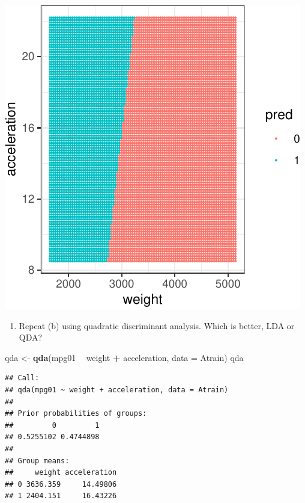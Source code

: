 \documentclass[]{article}
\newenvironment{Shaded}{\begin{snugshade}}{\end{snugshade}}
\newcommand{\DataTypeTok}[1]{\textcolor[rgb]{0.13,0.29,0.53}{#1}}
\newcommand{\KeywordTok}[1]{\textcolor[rgb]{0.13,0.29,0.53}{\textbf{#1}}}
\newcommand{\NormalTok}[1]{#1}
\newcommand{\OperatorTok}[1]{\textcolor[rgb]{0.81,0.36,0.00}{\textbf{#1}}}
\newcommand{\StringTok}[1]{\textcolor[rgb]{0.31,0.60,0.02}{#1}}
\providecommand{\tightlist}{%
  \setlength{\itemsep}{0pt}\setlength{\parskip}{0pt}}
\begin{document}
\begin{center}\includegraphics{sol_A3_files/figure-latex/unnamed-chunk-10-1} \end{center}

\begin{enumerate}
\def\labelenumi{(\alph{enumi})}
\setcounter{enumi}{2}
\tightlist
\item
  Repeat (b) using quadratic discriminant analysis. Which is better, LDA
  or QDA?
\end{enumerate}

\begin{Shaded}
\begin{Highlighting}[]
\NormalTok{qda <-}\StringTok{ }\KeywordTok{qda}\NormalTok{(mpg01 }\OperatorTok{~}\StringTok{ }\NormalTok{weight }\OperatorTok{+}\StringTok{ }\NormalTok{acceleration, }\DataTypeTok{data =}\NormalTok{ Atrain)}
\NormalTok{qda}
\end{Highlighting}
\end{Shaded}

\begin{verbatim}
## Call:
## qda(mpg01 ~ weight + acceleration, data = Atrain)
## 
## Prior probabilities of groups:
##         0         1 
## 0.5255102 0.4744898 
## 
## Group means:
##     weight acceleration
## 0 3636.359     14.49806
## 1 2404.151     16.43226
\end{verbatim}
\end{document}

